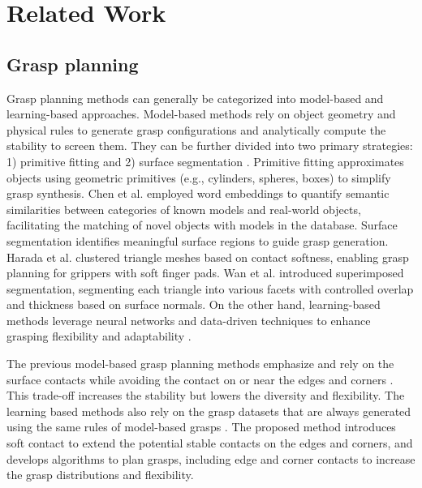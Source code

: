 \documentclass[journal]{IEEEtran}
\begin{document}

\section{Related Work}
\label{sec:related}
\subsection{Grasp planning}
Grasp planning methods can generally be categorized into model-based and learning-based approaches. Model-based methods rely on object geometry and physical rules to generate grasp configurations and analytically compute the stability to screen them. They can be further divided into two primary strategies: 1) primitive fitting \cite{chen2022category} and 2) surface segmentation \cite{harada2011grasp}\cite{wan2020planning}. Primitive fitting approximates objects using geometric primitives (e.g., cylinders, spheres, boxes) to simplify grasp synthesis. 
Chen et al. \cite{chen2022category} employed word embeddings to quantify semantic similarities between categories of known models and real-world objects, facilitating the matching of novel objects with models in the database.
Surface segmentation identifies meaningful surface regions to guide grasp generation. Harada et al. \cite{harada2011grasp} clustered triangle meshes based on contact softness, enabling grasp planning for grippers with soft finger pads. Wan et al. \cite{wan2020planning} introduced superimposed segmentation, segmenting each triangle into various facets with controlled overlap and thickness based on surface normals. On the other hand, learning-based methods leverage neural networks and data-driven techniques to enhance grasping flexibility and adaptability \cite{mahler2019learning}\cite{cao2022efficient}. 

The previous model-based grasp planning methods emphasize and rely on the surface contacts \cite{miller_graspit_2021} while avoiding the contact on or near the edges and corners \cite{wan2020planning}. This trade-off increases the stability but lowers the diversity and flexibility. The learning based methods also rely on the grasp datasets that are always generated using the same rules of model-based grasps \cite{ten2017grasp}. The proposed method introduces soft contact to extend the potential stable contacts on the edges and corners, and develops algorithms to plan grasps, including edge and corner contacts to increase the grasp distributions and flexibility. 
\end{document}
